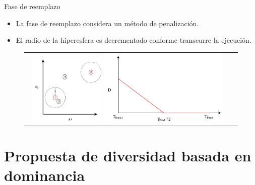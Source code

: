\documentclass{beamer}
\begin{document}

\begin{frame}{Fase de reemplazo}
\begin{itemize}
\justifying
\item La fase de reemplazo considera un método de penalización.
\justifying
\item El radio de la hiperesfera es decrementado conforme transcurre la ejecución.
\end{itemize}
\begin{figure}
\centering
\begin{tabular}{cc}
\includegraphics[width=0.35\textwidth]{Images/Metodo_Penalizacion.pdf} \quad \quad \quad
\includegraphics[width=0.6\textwidth]{Images/Modelo.pdf}
\end{tabular}
\label{fig:DiversityProposal}
\end{figure}
\end{frame}



\section{Propuesta de diversidad basada en dominancia}
\end{document}
